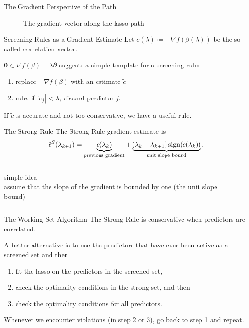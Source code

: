 \begin{frame}{The Gradient Perspective of the Path}
  \begin{figure}
    
    \caption{The gradient vector along the lasso path}
  \end{figure}
\end{frame}

\begin{frame}{Screening Rules as a Gradient Estimate}
  Let \(c(\lambda) \coloneqq -\nabla f(\beta(\lambda))\)
  be the so-called \alert{correlation} vector.

  \medskip

  \(\boldsymbol{0} \in \nabla f(\beta)
  + \lambda \partial\) suggests a simple template for a screening rule:
  \begin{enumerate}
    \item replace \(-\nabla f(\beta)\) with an estimate \(\tilde c\)
    \item rule: if \(|\tilde c_j| < \lambda\), discard predictor \(j\).
  \end{enumerate}
  
  \medskip
  
  If \(\tilde c\) is accurate and not too conservative, we
  have a useful rule.
\end{frame}

\begin{frame}{The Strong Rule}
  The Strong Rule gradient estimate is
  \[
    \tilde c^S(\lambda_{k+1}) =
    \underbrace{c(\lambda_k)}_\text{previous gradient} +
    \underbrace{(\lambda_k - \lambda_{k+1})\operatorname{sign}(c(\lambda_k))}_\text{unit
      slope
      bound}.
  \]
  \begin{columns}[T]
    \begin{column}{0.45\linewidth}
      \alert{simple idea}\\
      assume that the slope of the gradient is bounded by one (the
      unit slope bound)~\parencite{tibshirani2012}
    \end{column}
    \begin{column}{0.45\linewidth}
        \centering
        
    \end{column}
  \end{columns}
\end{frame}

\begin{frame}{The Working Set Algorithm}
  The Strong Rule is conservative when predictors are correlated. \medskip

  A better alternative is to use the predictors that have
  \alert{ever been active} as a screened set and then
  \begin{enumerate}
    \item fit the lasso on the predictors in the screened set,
    \item check the optimality conditions in the strong set, and then
    \item check the optimality conditions for all predictors.
  \end{enumerate}
  Whenever we encounter violations (in step 2 or 3), go back to step 1 and
  repeat.
\end{frame}


